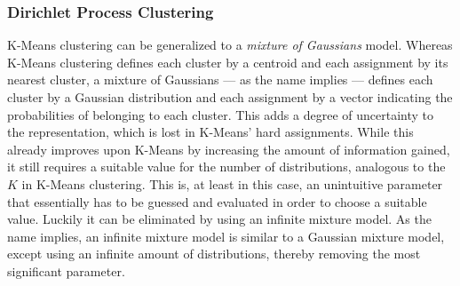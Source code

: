 \subsubsection{Dirichlet Process Clustering}
K-Means clustering can be generalized to a \emph{mixture of Gaussians} model.
Whereas K-Means clustering defines each cluster by a centroid and each
assignment by its nearest cluster, a mixture of Gaussians --- as the name
implies --- defines each cluster by a Gaussian distribution and each
assignment by a vector indicating the probabilities of belonging to each
cluster. This adds a degree of uncertainty to the representation, which is
lost in K-Means' hard assignments. While this already improves upon K-Means by
increasing the amount of information gained, it still requires a suitable
value for the number of distributions, analogous to the $K$ in K-Means
clustering. This is, at least in this case, an unintuitive parameter that
essentially has to be guessed and evaluated in order to choose a suitable
value. Luckily it can be eliminated by using an infinite mixture model. As the
name implies, an infinite mixture model is similar to a Gaussian mixture
model, except using an infinite amount of distributions, thereby removing the
most significant parameter.

